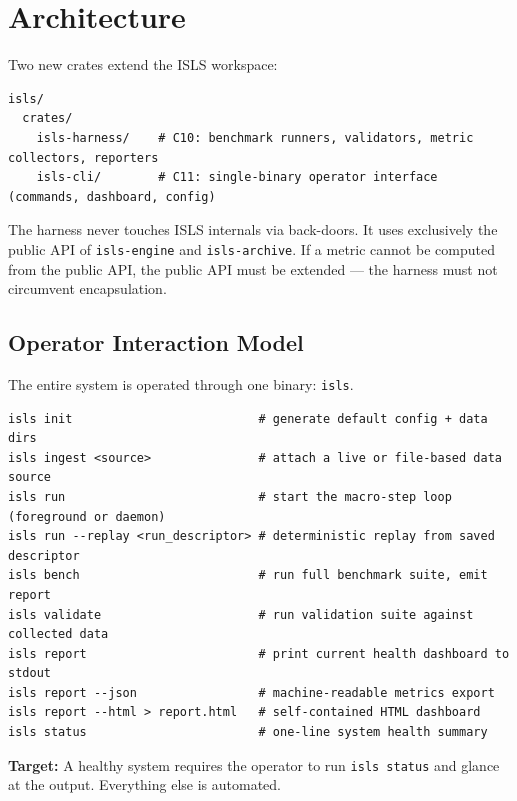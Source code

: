 \documentclass[10pt,a4paper]{article}
\begin{document}
\section{Architecture}

Two new crates extend the ISLS workspace:

\begin{lstlisting}[style=yaml]
isls/
  crates/
    isls-harness/    # C10: benchmark runners, validators, metric collectors, reporters
    isls-cli/        # C11: single-binary operator interface (commands, dashboard, config)
\end{lstlisting}

\begin{specbox}
The harness never touches ISLS internals via back-doors. It uses exclusively the public API of \texttt{isls-engine} and \texttt{isls-archive}. If a metric cannot be computed from the public API, the public API must be extended --- the harness must not circumvent encapsulation.
\end{specbox}

\subsection{Operator Interaction Model}

The entire system is operated through one binary: \texttt{isls}.

\begin{lstlisting}[style=sh]
isls init                          # generate default config + data dirs
isls ingest <source>               # attach a live or file-based data source
isls run                           # start the macro-step loop (foreground or daemon)
isls run --replay <run_descriptor> # deterministic replay from saved descriptor
isls bench                         # run full benchmark suite, emit report
isls validate                      # run validation suite against collected data
isls report                        # print current health dashboard to stdout
isls report --json                 # machine-readable metrics export
isls report --html > report.html   # self-contained HTML dashboard
isls status                        # one-line system health summary
\end{lstlisting}

\textbf{Target:} A healthy system requires the operator to run \texttt{isls status} and glance at the output. Everything else is automated.
\end{document}
